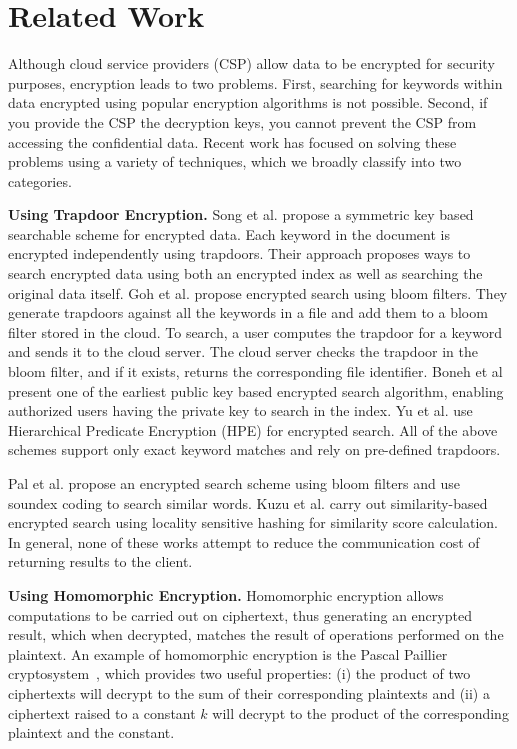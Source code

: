 \section{Related Work}
\label{sec:related}

Although cloud service providers (CSP) allow data to be encrypted for security
purposes, encryption leads to two problems. First, searching for 
keywords within data encrypted using popular encryption algorithms is not
possible. Second, if you provide the CSP the decryption keys, 
you cannot prevent the CSP from accessing the confidential 
data.
Recent work has focused on solving these problems using a variety of techniques,
which we broadly classify into two categories.

\textbf{Using Trapdoor Encryption.}
Song et al. \cite{song} propose a symmetric key based
searchable scheme for encrypted data. Each keyword in the document is encrypted independently
using trapdoors. Their approach proposes ways to search encrypted data using 
both an
encrypted index as well as searching the original data itself. 
Goh et al.\cite{goh2003secure} propose encrypted search using bloom filters. They generate trapdoors
against all the keywords in a file and add them to a bloom filter stored
in the cloud. 
To search, a user computes the trapdoor for a keyword and sends it to the cloud
server. The cloud server checks the trapdoor in the bloom filter, and if
it exists, returns the corresponding file identifier. 
Boneh et al \cite{boneh}
present one of the earliest public key based encrypted search algorithm, 
enabling 
authorized users having 
the private key to search in the index. 
Yu et al. \cite{li} use
Hierarchical Predicate Encryption (HPE) for encrypted search. 
All of the above schemes support only
exact keyword matches and rely on pre-defined trapdoors.

Pal et al. \cite{saibal} propose an encrypted search scheme using bloom filters
and use soundex coding to search similar words. Kuzu et al.\cite{mehmat} carry out similarity-based encrypted search 
using locality sensitive hashing for similarity score calculation. 
In general, none of these works attempt to reduce the communication cost of 
returning results to the client.


\textbf{Using Homomorphic Encryption.}
Homomorphic encryption
allows computations to be carried out on ciphertext, thus generating an 
encrypted result, which when decrypted, matches the result of operations performed 
on the plaintext. An example of homomorphic encryption is the Pascal Paillier 
cryptosystem~\cite{pascal}, which provides two useful properties: 
(i) the product of two ciphertexts will decrypt to the sum of their corresponding plaintexts
and (ii) a ciphertext raised to a constant $k$ will decrypt to the product of the 
corresponding plaintext and the constant.

